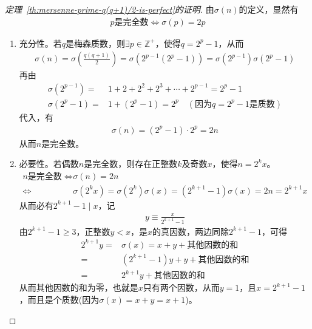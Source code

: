 \begin{proof}[定理~\ref{th:mersenne-prime-q(q+1)/2-is-perfect}的证明]
  由$\sigma(n)$的定义，显然有
  \begin{align*}
    p\text{是完全数} \iff \sigma(p) = 2p
  \end{align*}

  \begin{enumerate}
  \item 充分性。若$q$是梅森质数，则$\exists p\in\mathbb{Z^+}$，使得$q=2^p-1$，从而
    \begin{align*}
      \sigma(n) = \sigma\left(\frac{q(q+1)}{2}\right) = \sigma\left( 2^{p-1}(2^p -1)\right) = \sigma\left( 2^{p-1}\right) \sigma\left( 2^p -1\right) 
    \end{align*}
    再由
    \begin{align*}
      \sigma\left(2^{p-1}\right) ={}& 1 + 2 + 2^2 + 2^3 + \cdots + 2^{p-1} = 2^p - 1\\
      \sigma\left(2^p - 1\right) ={}& 1 + (2^p -1) = 2^p\quad(\text{因为$q=2^p - 1$是质数})
    \end{align*}
    代入，有
    \begin{align*}
      \sigma(n) = (2^p - 1) \cdot 2^p = 2n
    \end{align*}
    从而$n$是完全数。
    
  \item 必要性。若偶数$n$是完全数，则存在正整数$k$及奇数$x$，使得$n=2^k x$。
    \begin{align*}
      n\text{是完全数} \iff&&    \sigma(n) = 2n\\
                      \iff&& \sigma(2^kx) = \sigma(2^k)\sigma(x) = (2^{k+1} - 1) \sigma(x) = 2n = 2^{k+1} x
    \end{align*}
    从而必有$2^{k+1} - 1 \mid x$，记
    \begin{align*}
      y\equiv \frac{x}{2^{k+1} - 1}
    \end{align*}
    由$2^{k+1}-1\ge 3$，正整数$y<x$，是$x$的真因数，两边同除$2^{k+1}-1$，可得
    \begin{align*}
      2^{k+1} y ={}& \sigma(x) = x + y + \text{其他因数的和}\\
      ={}& (2^{k+1} - 1)y + y + \text{其他因数的和}\\
      ={}& 2^{k+1} y + \text{其他因数的和}
    \end{align*}
    从而其他因数的和为零，也就是$x$只有两个因数，从而$y=1$，且$x=2^{k+1}-1$，而且是个质数(因为$\sigma(x)=x+y=x+1$)。\qedhere
  \end{enumerate}
\end{proof}

